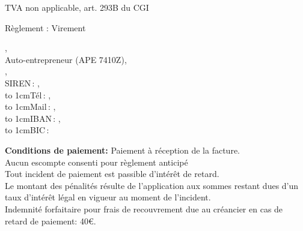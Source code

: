 \documentclass[a4paper]{article}
\def\footnotestyle#1{%
  {\textsf{\color{footnotegray}\fontsize{3mm}{0mm}\selectfont #1}}%
}
\begin{document}
\begin{flushright}
\vskip -0.3cm
\color{gray!10!black}
\footnotestyle{TVA non applicable, art. 293B du CGI}
\end{flushright}


\vfill


\color{gray!60!black}
\setlength{\columnsep}{1.5cm}
\noindent Règlement : Virement
\begin{multicols}{2}
\noindent\companyname{},\\
Auto-entrepreneur {\small \ttfamily (APE 7410Z)},\\
\rmfamily \companyaddress{},\\
\rmfamily SIREN\,: \ttfamily \small \companysiren{},\\
\hbox to 1cm{\rmfamily Tél\,:\hss} \ttfamily \small \companytel,\\
\hbox to 1cm{\rmfamily Mail\,:\hss} \companyemail,\\
\hbox to 1cm{\rmfamily IBAN\,:\hss} \ttfamily \small \bankiban,\\
\hbox to 1cm{\rmfamily BIC\,:\hss} \ttfamily \small \bankbic
\end{multicols}

\noindent \footnotestyle{\textbf{Conditions de paiement:} Paiement à réception de la facture.\\
Aucun escompte consenti pour règlement anticipé\\
Tout incident de paiement est passible d'intérêt de retard.\\
Le montant des pénalités résulte de l'application aux sommes restant dues d'un taux d'intérêt légal en vigueur au moment de l'incident.\\
Indemnité forfaitaire pour frais de recouvrement due au créancier en cas de retard de paiement: 40€. }
\end{document}
